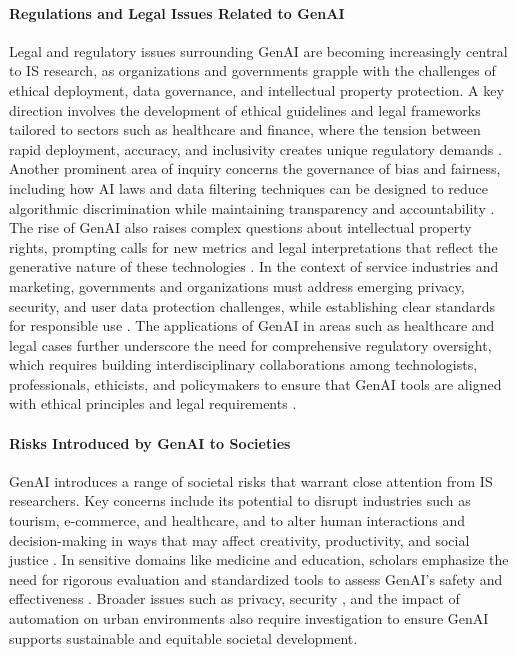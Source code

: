 \paragraph{Regulations and Legal Issues Related to GenAI}
Legal and regulatory issues surrounding GenAI are becoming increasingly central to IS research, as organizations and governments grapple with the challenges of ethical deployment, data governance, and intellectual property protection. A key direction involves the development of ethical guidelines and legal frameworks tailored to sectors such as healthcare and finance, where the tension between rapid deployment, accuracy, and inclusivity creates unique regulatory demands \parencite{R01}.
Another prominent area of inquiry concerns the governance of bias and fairness, including how AI laws and data filtering techniques can be designed to reduce algorithmic discrimination while maintaining transparency and accountability \parencite{R07, S18}. The rise of GenAI also raises complex questions about intellectual property rights, prompting calls for new metrics and legal interpretations that reflect the generative nature of these technologies \parencite{R07, R08}. In the context of service industries and marketing, governments and organizations must address emerging privacy, security, and user data protection challenges, while establishing clear standards for responsible use \parencite{R08, S11}.
The applications of GenAI in areas such as healthcare and legal cases further underscore the need for comprehensive regulatory oversight, which requires building interdisciplinary collaborations among technologists, professionals, ethicists, and policymakers to ensure that GenAI tools are aligned with ethical principles and legal requirements \parencite{R10, S11, S16}.

\paragraph{Risks Introduced by GenAI to Societies}
GenAI introduces a range of societal risks that warrant close attention from IS researchers. Key concerns include its potential to disrupt industries such as tourism, e-commerce, and healthcare, and to alter human interactions and decision-making in ways that may affect creativity, productivity, and social justice \parencite{R02, R07, R08}. In sensitive domains like medicine and education, scholars emphasize the need for rigorous evaluation and standardized tools to assess GenAI’s safety and effectiveness \parencite{S01, S14}. Broader issues such as privacy, security \parencite{R10}, and the impact of automation on urban environments \parencite{S15} also require investigation to ensure GenAI supports sustainable and equitable societal development.

